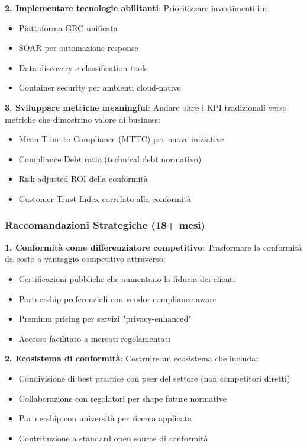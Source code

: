\textbf{2. Implementare tecnologie abilitanti}:
Prioritizzare investimenti in:
\begin{itemize}
    \item Piattaforma GRC unificata
    \item SOAR per automazione response
    \item Data discovery e classification tools
    \item Container security per ambienti cloud-native
\end{itemize}

\textbf{3. Sviluppare metriche meaningful}:
Andare oltre i KPI tradizionali verso metriche che dimostrino valore di business:
\begin{itemize}
    \item Mean Time to Compliance (MTTC) per nuove iniziative
    \item Compliance Debt ratio (technical debt normativo)
    \item Risk-adjusted ROI della conformità
    \item Customer Trust Index correlato alla conformità
\end{itemize}

\subsubsection{Raccomandazioni Strategiche (18+ mesi)}

\textbf{1. Conformità come differenziatore competitivo}:
Trasformare la conformità da costo a vantaggio competitivo attraverso:
\begin{itemize}
    \item Certificazioni pubbliche che aumentano la fiducia dei clienti
    \item Partnership preferenziali con vendor compliance-aware
    \item Premium pricing per servizi "privacy-enhanced"
    \item Accesso facilitato a mercati regolamentati
\end{itemize}

\textbf{2. Ecosistema di conformità}:
Costruire un ecosistema che includa:
\begin{itemize}
    \item Condivisione di best practice con peer del settore (non competitori diretti)
    \item Collaborazione con regolatori per shape future normative
    \item Partnership con università per ricerca applicata
    \item Contribuzione a standard open source di conformità
\end{itemize}

